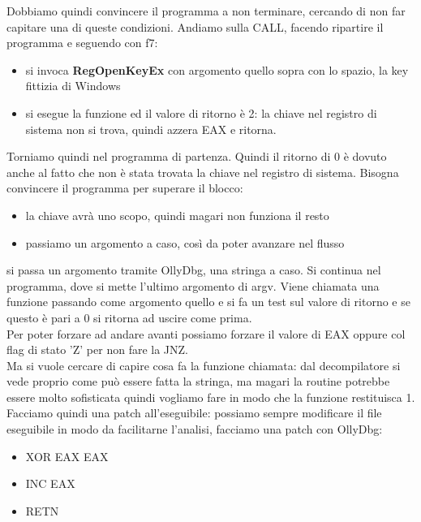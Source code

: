 \documentclass[12pt, oneside]{extbook}
\begin{document}
Dobbiamo quindi convincere il programma a non terminare, cercando di non far capitare una di queste condizioni. Andiamo sulla CALL, facendo ripartire il programma e seguendo con f7:
\begin{itemize}
\item si invoca \textbf{RegOpenKeyEx} con argomento quello sopra con lo spazio, la key fittizia di Windows
\item si esegue la funzione ed il valore di ritorno è 2: la chiave nel registro di sistema non si trova, quindi azzera EAX e ritorna.
\end{itemize}
Torniamo quindi nel programma di partenza. Quindi il ritorno di 0 è dovuto anche al fatto che non è stata trovata la chiave nel registro di sistema. Bisogna convincere il programma per superare il blocco:
\begin{itemize}
\item la chiave avrà uno scopo, quindi magari non funziona il resto
\item passiamo un argomento a caso, così da poter avanzare nel flusso
\end{itemize}
si passa un argomento tramite OllyDbg, una stringa a caso. Si continua nel programma, dove si mette l'ultimo argomento di argv. Viene chiamata una funzione passando come argomento quello e si fa un test sul valore di ritorno e se questo è pari a 0 si ritorna ad uscire come prima.\\Per poter forzare ad andare avanti possiamo forzare il valore di EAX oppure col flag di stato 'Z' per non fare la JNZ.\\Ma si vuole cercare di capire cosa fa la funzione chiamata: dal decompilatore si vede proprio come può essere fatta la stringa, ma magari la routine potrebbe essere molto sofisticata quindi vogliamo fare in modo che la funzione restituisca 1.\\Facciamo quindi una patch all'eseguibile: possiamo sempre modificare il file eseguibile in modo da facilitarne l'analisi, facciamo una patch con OllyDbg:
\begin{itemize}
\item XOR EAX EAX
\item INC EAX
\item RETN
\end{itemize}
\end{document}
